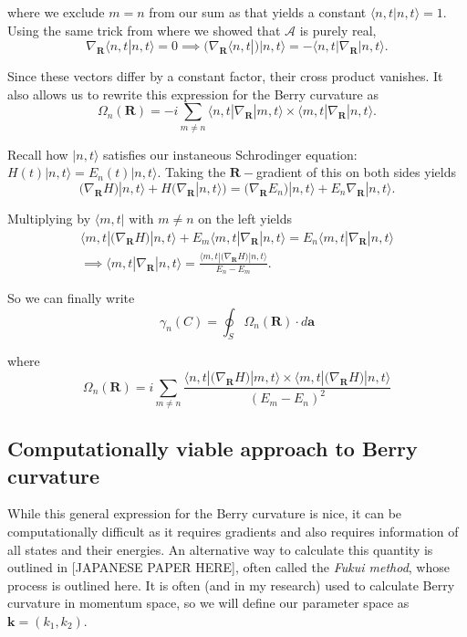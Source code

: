 \documentclass[12pt]{revtex4-2}
\begin{document}
where we exclude $m=n$ from our sum as that yields a constant $\langle n,t|n,t\rangle=1$.  Using the same trick from where we showed that $\mathcal{A}$ is purely real, 
\begin{equation}
    \nabla_\mathbf{R}\langle n,t|n,t\rangle=0 \implies \Big( \nabla_\mathbf{R}\langle n,t| \Big)|n,t\rangle = -\langle n,t| \nabla_\mathbf{R} |n,t\rangle.
\end{equation}

Since these vectors differ by a constant factor, their cross product vanishes.  It also allows us to rewrite this expression for the Berry curvature as 
\begin{equation}
    \Omega_n(\mathbf{R}) = -i\sum_{m\neq n} \langle n,t | \nabla_\mathbf{R} | m,t\rangle \times \langle m,t| \nabla_\mathbf{R} | n,t\rangle.
\end{equation}

Recall how $|n,t\rangle$ satisfies our instaneous Schrodinger equation: $H(t)|n,t\rangle = E_n(t)|n,t\rangle$.  Taking the $\mathbf{R}-$gradient of this on both sides yields 
\begin{equation}
    \big(\nabla_\mathbf{R} H\big)|n,t\rangle + H\Big(\nabla_\mathbf{R} |n,t\rangle\Big) = \Big(\nabla_\mathbf{R} E_n\Big)|n,t\rangle + E_n\nabla_\mathbf{R}|n,t\rangle. 
\end{equation}

Multiplying by $\langle m,t|$ with $m\neq n$ on the left yields 
\begin{multline}
    \langle m,t| \big( \nabla_\mathbf{R} H \big) |n,t\rangle + E_m\langle m,t|\nabla_\mathbf{R}|n,t\rangle = E_n\langle m,t | \nabla_\mathbf{R} | n,t\rangle \\
    \implies \langle m,t| \nabla_\mathbf{R} | n,t\rangle = \frac{\langle m,t| \big( \nabla_\mathbf{R} H \big) |n,t\rangle}{E_n - E_m}.
\end{multline}

So we can finally write 
\begin{equation}
    \boxed{\gamma_n(C) = \oint_S \Omega_n(\mathbf{R}) \cdot d\mathbf{a}}
\end{equation}

where 
\begin{equation}
    \boxed{\Omega_n(\mathbf{R}) = i\sum_{m \neq n} \frac{\langle n,t | \big( \nabla_\mathbf{R}H \big) | m,t\rangle \times \langle m,t|\big( \nabla_\mathbf{R} H \big) | n,t \rangle}{(E_m - E_n)^2}}
\end{equation}

\subsection{Computationally viable approach to Berry curvature}
While this general expression for the Berry curvature is nice, it can be computationally difficult as it requires gradients and also requires information of all states and their energies.  An alternative way to calculate this quantity is outlined in [JAPANESE PAPER HERE], often called the \emph{Fukui method}, whose process is outlined here.  It is often (and in my research) used to calculate Berry curvature in momentum space, so we will define our parameter space as $\mathbf{k} = (k_1,k_2)$. \par
\end{document}

